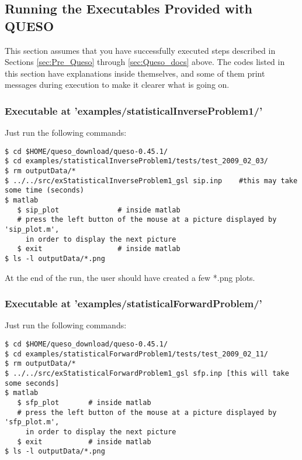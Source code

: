 \subsection{Running the Executables Provided with QUESO} \label{sc-running-execs}

This section assumes that you have successfully executed steps described in Sections \ref{sec:Pre_Queso} through \ref{sec:Queso_docs} above.
The codes listed in this section have explanations inside themselves, and some of them
print messages during execution to make it clearer what is going on.

\subsubsection{Executable at 'examples/statisticalInverseProblem1/'}


Just run the following commands:
\begin{verbatim}
$ cd $HOME/queso_download/queso-0.45.1/
$ cd examples/statisticalInverseProblem1/tests/test_2009_02_03/
$ rm outputData/*
$ ../../src/exStatisticalInverseProblem1_gsl sip.inp    #this may take some time (seconds)
$ matlab
   $ sip_plot	           # inside matlab
   # press the left button of the mouse at a picture displayed by 'sip_plot.m', 
     in order to display the next picture
   $ exit                  # inside matlab
$ ls -l outputData/*.png
\end{verbatim}

At the end of the run, the user should have created a few *.png plots.

\subsubsection{Executable at 'examples/statisticalForwardProblem/'}

Just run the following commands:
\begin{verbatim}
$ cd $HOME/queso_download/queso-0.45.1/
$ cd examples/statisticalForwardProblem1/tests/test_2009_02_11/
$ rm outputData/*
$ ../../src/exStatisticalForwardProblem1_gsl sfp.inp [this will take some seconds]
$ matlab
   $ sfp_plot       # inside matlab
   # press the left button of the mouse at a picture displayed by 'sfp_plot.m', 
     in order to display the next picture
   $ exit           # inside matlab
$ ls -l outputData/*.png
\end{verbatim}


